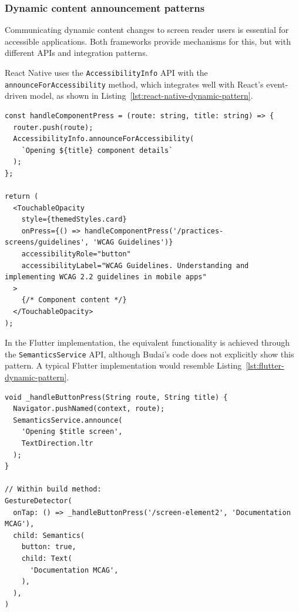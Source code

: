 \subsubsection{Dynamic content announcement patterns}
\label{subsec:dynamic-announcement-patterns}

Communicating dynamic content changes to screen reader users is essential for accessible applications. Both frameworks provide mechanisms for this, but with different APIs and integration patterns.

React Native uses the \texttt{AccessibilityInfo} API with the \texttt{announceForAccessibility} method, which integrates well with React's event-driven model, as shown in Listing~\ref{lst:react-native-dynamic-pattern}.

\begin{lstlisting}[style=ReactNativeStyle, caption=Dynamic content announcement in React Native, label=lst:react-native-dynamic-pattern]
const handleComponentPress = (route: string, title: string) => {
  router.push(route);
  AccessibilityInfo.announceForAccessibility(
    `Opening ${title} component details`
  );
};

return (
  <TouchableOpacity
    style={themedStyles.card}
    onPress={() => handleComponentPress('/practices-screens/guidelines', 'WCAG Guidelines')}
    accessibilityRole="button"
    accessibilityLabel="WCAG Guidelines. Understanding and implementing WCAG 2.2 guidelines in mobile apps"
  >
    {/* Component content */}
  </TouchableOpacity>
);
\end{lstlisting}

\pagebreak

In the Flutter implementation, the equivalent functionality is achieved through the \texttt{SemanticsService} API, although Budai's code does not explicitly show this pattern. A typical Flutter implementation would resemble Listing~\ref{lst:flutter-dynamic-pattern}.

\begin{lstlisting}[style=DartStyle, caption=Dynamic content announcement in Flutter, label=lst:flutter-dynamic-pattern]
void _handleButtonPress(String route, String title) {
  Navigator.pushNamed(context, route);
  SemanticsService.announce(
    'Opening $title screen',
    TextDirection.ltr
  );
}

// Within build method:
GestureDetector(
  onTap: () => _handleButtonPress('/screen-element2', 'Documentation MCAG'),
  child: Semantics(
    button: true,
    child: Text(
      'Documentation MCAG',
    ),
  ),
)
\end{lstlisting}

